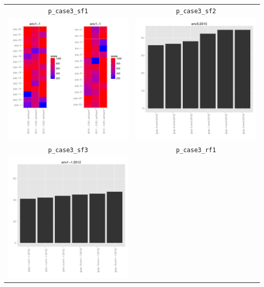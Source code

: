 \documentclass{article}\usepackage[]{graphicx}\usepackage[]{color}
\newenvironment{knitrout}{}{} %
\begin{document}
\begin{center}
\begin{tabular}{cc}
\texttt{p\_case3\_sf1} & \texttt{p\_case3\_sf2} \\
\begin{knitrout}
\definecolor{shadecolor}{rgb}{0.969, 0.969, 0.969}\color{fgcolor}

{\centering \includegraphics[width=.4\textwidth]{figures/PPBstats_unnamed-chunk-26-1} 

}



\end{knitrout}
&
\begin{knitrout}
\definecolor{shadecolor}{rgb}{0.969, 0.969, 0.969}\color{fgcolor}

{\centering \includegraphics[width=.4\textwidth]{figures/PPBstats_unnamed-chunk-27-1} 

}



\end{knitrout}
\\
\texttt{p\_case3\_sf3} & \texttt{p\_case3\_rf1} \\
\begin{knitrout}
\definecolor{shadecolor}{rgb}{0.969, 0.969, 0.969}\color{fgcolor}

{\centering \includegraphics[width=.4\textwidth]{figures/PPBstats_unnamed-chunk-28-1} 

}
\end{knitrout}
\end{tabular}
\end{center}
\end{document}
